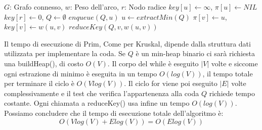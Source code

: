 \begin{algorithm}[h]
	\caption{prim(G, w, r)}
	\begin{algorithmic}[i]
		\Require $G$: Grafo connesso, $w$: Peso dell'arco, $r$: Nodo radice
		 
		\State $key[u]\gets \infty$, $\pi[u]\gets NIL$
		\EndFor
		\State $key[r]\gets 0$, $Q\gets \emptyset$
		\State
		\State $enqueue(Q, u)$
		\EndFor
		\State
		\State $u\gets extractMin(Q)$ 
		 
		\State $\pi[v]\gets u$, $key[v]\gets w(u,v)$ 
		\State $reduceKey(Q, v, w(u,v))$ 
		\EndIf
		\EndFor
		\EndWhile
	\end{algorithmic}
\end{algorithm}

\noindent Il tempo di esecuzione di Prim, Come per Kruskal, dipende dalla struttura dati utilizzata per implementare la coda. Se $Q$ è un min-heap binario ci sarà richiesta una buildHeap(), di costo $O(V)$. Il corpo del while è eseguito $|V|$ volte e siccome ogni estrazione di minimo è eseguita in un tempo $O(log(V))$, il tempo totale per terminare il ciclo è $O(Vlog(V))$. Il ciclo for viene poi eseguito $|E|$ volte complessivamente e il test che verifica l'appartenenza alla coda $Q$ richiede tempo costante. Ogni chiamata a reduceKey() usa infine un tempo $O(log(V))$. Possiamo concludere che il tempo di esecuzione totale dell'algoritmo è: \[O(Vlog(V) + Elog(V)) = O(Elog(V))\]

%


